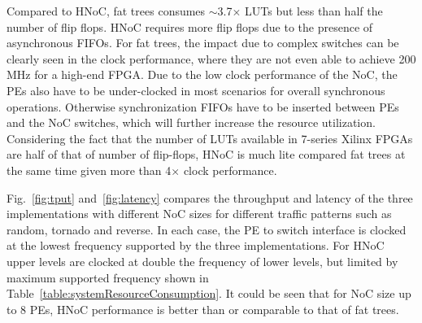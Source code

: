Compared to HNoC, fat trees consumes $\sim$3.7$\times$ LUTs but less than half the number of flip flops.
HNoC requires more flip flops due to the presence of asynchronous FIFOs.
For fat trees, the impact due to complex switches can be clearly seen in the clock performance, where they are not even able to achieve 200 MHz for a high-end FPGA.
Due to the low clock performance of the NoC, the PEs also have to be under-clocked in most scenarios for overall synchronous operations.
Otherwise synchronization FIFOs have to be inserted between PEs and the NoC switches, which will further increase the resource utilization.
Considering the fact that the number of LUTs available in 7-series Xilinx FPGAs are half of that of number of flip-flops, HNoC is much lite compared fat trees at the same time given more than 4$\times$ clock performance.

Fig.~\ref{fig:tput} and~\ref{fig:latency} compares the throughput and latency of the three implementations with different NoC sizes for different traffic patterns such as random, tornado and reverse.
In each case, the PE to switch interface is clocked at the lowest frequency supported by the three implementations.
For HNoC upper levels are clocked at double the frequency of lower levels, but limited by maximum supported frequency shown in Table~\ref{table:systemResourceConsumption}.
It could be seen that for NoC size up to 8 PEs, HNoC performance is better than or comparable to that of fat trees.
  

